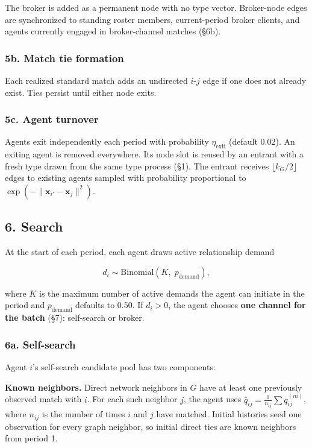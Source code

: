 \documentclass[11pt]{article}
\begin{document}
The broker is added as a permanent node with no type vector. Broker-node edges are synchronized to standing roster members, current-period broker clients, and agents currently engaged in broker-channel matches (§6b).

\subsubsection{5b. Match tie formation}\label{b.-match-tie-formation}

Each realized standard match adds an undirected \(i\)-\(j\) edge if one does not already exist. Ties persist until either node exits.

\subsubsection{5c. Agent turnover}\label{c.-agent-turnover}

Agents exit independently each period with probability \(\eta_{\mathrm{exit}}\) (default 0.02). An exiting agent is removed everywhere. Its node slot is reused by an entrant with a fresh type drawn from the same type process (§1). The entrant receives \(\lfloor k_G/2 \rfloor\) edges to existing agents sampled with probability proportional to \(\exp(-\|\mathbf{x}_{i'} - \mathbf{x}_j\|^2)\).

\subsection{6. Search}\label{search}

At the start of each period, each agent draws active relationship demand

\[d_i \sim \text{Binomial}(K,\; p_{\text{demand}}),\]

where \(K\) is the maximum number of active demands the agent can initiate in the period and \(p_{\text{demand}}\) defaults to 0.50. If \(d_i > 0\), the agent chooses \textbf{one channel for the batch} (§7): self-search or broker.

\subsubsection{6a. Self-search}\label{a.-self-search}

Agent \(i\)'s self-search candidate pool has two components:

\textbf{Known neighbors.} Direct network neighbors in \(G\) have at least one previously observed match with \(i\). For each such neighbor \(j\), the agent uses \(\bar{q}_{ij} = \frac{1}{n_{ij}} \sum q_{ij}^{(m)}\), where \(n_{ij}\) is the number of times \(i\) and \(j\) have matched. Initial histories seed one observation for every graph neighbor, so initial direct ties are known neighbors from period 1.
\end{document}
